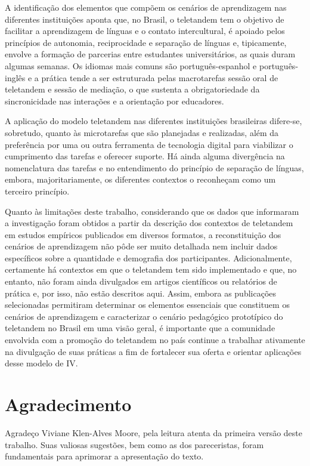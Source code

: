 \documentclass[portuguese]{textolivre}
\begin{document}
A identificação dos elementos que compõem os cenários de aprendizagem nas diferentes instituições aponta que, no Brasil, o teletandem tem o objetivo de facilitar a aprendizagem de línguas e o contato intercultural, é apoiado pelos princípios de autonomia, reciprocidade e separação de línguas e, tipicamente, envolve a formação de parcerias entre estudantes universitários, as quais duram algumas semanas. Os idiomas mais comuns são português-espanhol e português-inglês e a prática tende a ser estruturada pelas macrotarefas sessão oral de teletandem e sessão de mediação, o que sustenta a obrigatoriedade da sincronicidade nas interações e a orientação por educadores.

A aplicação do modelo teletandem nas diferentes instituições brasileiras difere-se, sobretudo, quanto às microtarefas que são planejadas e realizadas, além da preferência por uma ou outra ferramenta de tecnologia digital para viabilizar o cumprimento das tarefas e oferecer suporte. Há ainda alguma divergência na nomenclatura das tarefas e no entendimento do princípio de separação de línguas, embora, majoritariamente, os diferentes contextos o reconheçam como um terceiro princípio.

Quanto às limitações deste trabalho, considerando que os dados que informaram a investigação foram obtidos a partir da descrição dos contextos de teletandem em estudos empíricos publicados em diversos formatos, a reconstituição dos cenários de aprendizagem não pôde ser muito detalhada nem incluir dados específicos sobre a quantidade e demografia dos participantes. Adicionalmente, certamente há contextos em que o teletandem tem sido implementado e que, no entanto, não foram ainda divulgados em artigos científicos ou relatórios de prática e, por isso, não estão descritos aqui. Assim, embora as publicações selecionadas permitiram determinar os elementos essenciais que constituem os cenários de aprendizagem e caracterizar o cenário pedagógico prototípico do teletandem no Brasil em uma visão geral, é importante que a comunidade envolvida com a promoção do teletandem no país continue a trabalhar ativamente na divulgação de suas práticas a fim de fortalecer sua oferta e orientar aplicações desse modelo de IV.

\section*{Agradecimento}

Agradeço Viviane Klen-Alves Moore, pela leitura atenta da primeira versão deste trabalho. Suas valiosas sugestões, bem como as dos pareceristas, foram fundamentais para aprimorar a apresentação do texto.
\end{document}
